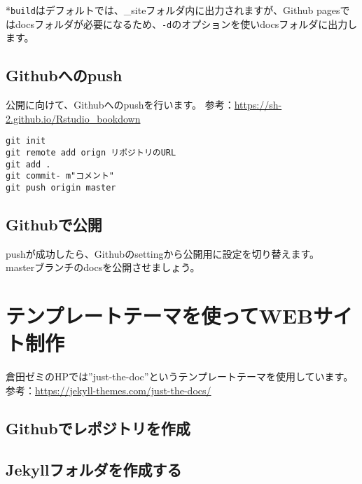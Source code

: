 \documentclass[
]{book}
\begin{document}
*\texttt{build}はデフォルトでは、\_siteフォルダ内に出力されますが、Github pagesではdocsフォルダが必要になるため、\texttt{-d}のオプションを使いdocsフォルダに出力します。

\hypertarget{githubux3078ux306epush}{%
\section{Githubへのpush}\label{githubux3078ux306epush}}

公開に向けて、Githubへのpushを行います。
参考：\url{https://sh-2.github.io/Rstudio_bookdown}

\begin{verbatim}
git init
git remote add orign リポジトリのURL
git add .
git commit- m"コメント"
git push origin master
\end{verbatim}

\hypertarget{githubux3067ux516cux958b}{%
\section{Githubで公開}\label{githubux3067ux516cux958b}}

pushが成功したら、Githubのsettingから公開用に設定を切り替えます。\\
masterブランチのdocsを公開させましょう。

\hypertarget{ux30c6ux30f3ux30d7ux30ecux30fcux30c8ux30c6ux30fcux30deux3092ux4f7fux3063ux3066webux30b5ux30a4ux30c8ux5236ux4f5c}{%
\chapter{テンプレートテーマを使ってWEBサイト制作}\label{ux30c6ux30f3ux30d7ux30ecux30fcux30c8ux30c6ux30fcux30deux3092ux4f7fux3063ux3066webux30b5ux30a4ux30c8ux5236ux4f5c}}

倉田ゼミのHPでは''just-the-doc''というテンプレートテーマを使用しています。\\
参考：\url{https://jekyll-themes.com/just-the-docs/}

\hypertarget{githubux3067ux30ecux30ddux30b8ux30c8ux30eaux3092ux4f5cux6210}{%
\section{Githubでレポジトリを作成}\label{githubux3067ux30ecux30ddux30b8ux30c8ux30eaux3092ux4f5cux6210}}

\hypertarget{jekyllux30d5ux30a9ux30ebux30c0ux3092ux4f5cux6210ux3059ux308b-1}{%
\section{Jekyllフォルダを作成する}\label{jekyllux30d5ux30a9ux30ebux30c0ux3092ux4f5cux6210ux3059ux308b-1}}
\end{document}
